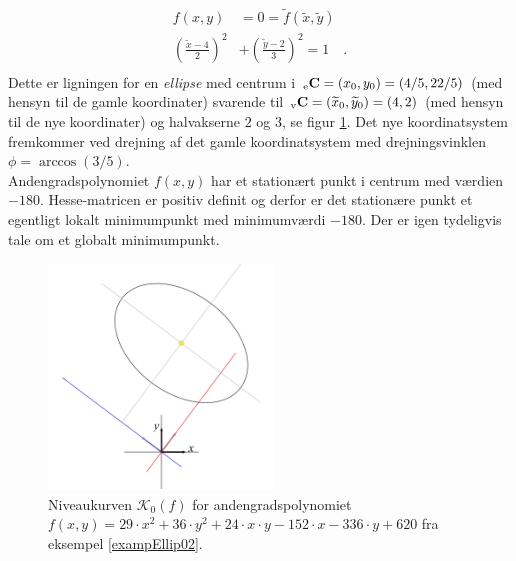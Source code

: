 \begin{example}[Ellipse]
\begin{equation}
\begin{aligned}
f(x,y) &= 0 =
\widetilde{f}(\widetilde{x}, \widetilde{y}) \\
\left(\frac{ \widetilde{x} - 4}{2} \right)^{2} &+ \left(\frac{\widetilde{y} - 2 }{3}\right)^{2} = 1 \quad . \\
\end{aligned}
\end{equation}
Dette er ligningen for en \emph{ellipse} med centrum i ${_\mathrm{e}\mathbf{\mathbf{C}}} = (x_{0}, y_{0}) =  (4/5, 22/5)$ (med hensyn til de gamle koordinater) svarende til
${_\mathrm{v}\mathbf{\mathbf{C}}} = (\widetilde{x}_{0}, \widetilde{y}_{0}) =  (4, 2 )$ (med hensyn til de nye koordinater)  og halvakserne $2$ og $3$, se figur \ref{figEllipKvadBig}. Det nye koordinatsystem fremkommer ved drejning af det gamle koordinatsystem med drejningsvinklen $\phi = \arccos(3/5)$.\\

Andengradspolynomiet $f(x,y)$ har et stationært punkt i centrum med værdien $-180$. Hesse-matricen er positiv definit og derfor er det stationære punkt et egentligt lokalt minimumpunkt  med minimumværdi $-180$. Der er igen tydeligvis tale om et globalt minimumpunkt.
\end{example}



\begin{figure}[ht]
\centerline{\includegraphics[height=60mm]{FIGS/plotEllipKvadBig.pdf}}
\begin{center}
\caption{Niveaukurven $\mathcal{K}_{0}(f)$ for andengradspolynomiet  $f(x,y) = 29\cdot x^{2} + 36\cdot y^{2} + 24\cdot x \cdot y - 152\cdot x -336\cdot y + 620$ fra eksempel \ref{exampEllip02}.} \label{figEllipKvadBig}
\end{center}
\end{figure}



